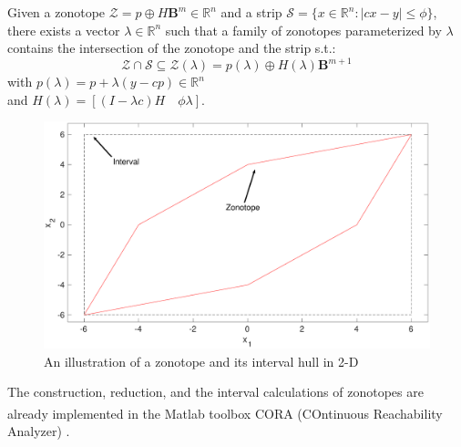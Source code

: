 \begin{lemma}\label{prop:intersect} \cite{Alamo2005}
Given a zonotope $\mathcal{Z} = p \oplus H\textbf{B}^m \in \mathbb{R}^n$ and a strip $\mathscr{S} = \{x \in \mathbb{R}^n : |cx-y| \leq \phi\}$, there exists a vector $\lambda \in \mathbb{R}^n$ such that a family of zonotopes parameterized by $\lambda$ contains the intersection of the zonotope and the strip s.t.:
\begin{equation}
\mathcal{Z} \cap \mathscr{S} \subseteq \mathcal{Z}(\lambda) =  p(\lambda) \oplus H(\lambda) \textbf{B}^{m+1}
\end{equation} 
with $p(\lambda) = p + \lambda(y - cp) \in \mathbb{R}^n$ \\
and $H(\lambda) = [(I - \lambda c)H \quad \phi \lambda]$.

\end{lemma}
\begin{figure}[!h]
\label{fig:zonotope}
\includegraphics[scale=1, width=\linewidth]{figures/zonotope}
\caption{An illustration of a zonotope and its interval hull in 2-D}
\end{figure}
The construction, reduction, and the interval calculations of zonotopes are already implemented in the Matlab\textsuperscript{\tiny\textregistered} toolbox CORA (COntinuous Reachability Analyzer) \cite{Althoff2018}.
